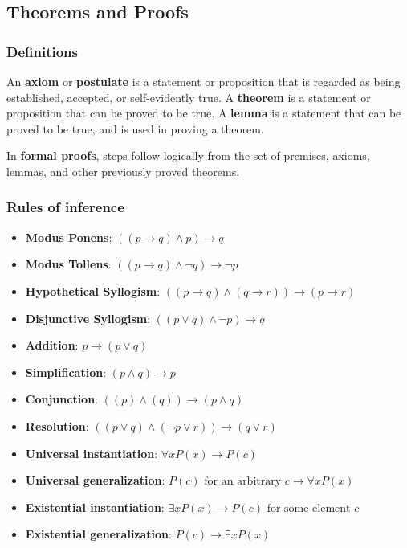 \documentclass[a4paper,12pt]{article}
\begin{document}
\subsection{Theorems and Proofs}

\subsubsection{Definitions}

An \textbf{axiom} or \textbf{postulate} is a statement or proposition that is regarded as being established, accepted, or self-evidently true.
A \textbf{theorem} is a statement or proposition that can be proved to be true.
A \textbf{lemma} is a statement that can be proved to be true, and is used in proving a theorem.

In \textbf{formal proofs}, steps follow logically from the set of premises, axioms, lemmas, and other previously proved theorems.

\subsubsection{Rules of inference}

\begin{itemize}
	\item \textbf{Modus Ponens}: $((p \rightarrow q) \wedge p) \rightarrow q$
	\item \textbf{Modus Tollens}: $((p \rightarrow q) \wedge \neg q) \rightarrow \neg p$
	\item \textbf{Hypothetical Syllogism}: $((p \rightarrow q) \wedge (q \rightarrow r)) \rightarrow (p \rightarrow r)$
	\item \textbf{Disjunctive Syllogism}: $((p \vee q) \wedge \neg p) \rightarrow q$
	\item \textbf{Addition}: $p \rightarrow (p \vee q)$
	\item \textbf{Simplification}: $(p \wedge q) \rightarrow p$
	\item \textbf{Conjunction}: $((p) \wedge (q)) \rightarrow (p \wedge q)$
	\item \textbf{Resolution}: $((p \vee q) \wedge (\neg p \vee r)) \rightarrow (q \vee r)$
	\item \textbf{Universal instantiation}: $\forall x P(x) \rightarrow P(c)$
	\item \textbf{Universal generalization}: $P(c) \text{ for an arbitrary } c\rightarrow \forall x P(x)$
	\item \textbf{Existential instantiation}: $\exists x P(x) \rightarrow P(c) \text{ for some element } c$
	\item \textbf{Existential generalization}: $P(c) \rightarrow \exists x P(x)$
\end{itemize}
\end{document}
